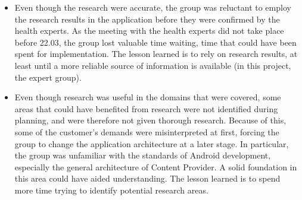 \begin{itemize}
\item
Even though the research were accurate, the group was reluctant to employ the research results in the application before they were confirmed by the health experts. As the meeting with the health experts did not take place before 22.03, the group lost valuable time waiting, time that could have been spent for implementation. The lesson learned is to rely on research results, at least until a more reliable source of information is available (in this project, the expert group).
\item
Even though research was useful in the domains that were covered, some areas that could have benefited from research were not identified during planning, and were therefore not given thorough research. Because of this, some of the customer's demands were misinterpreted at first, forcing the group to change the application architecture at a later stage. In particular, the group was unfamiliar with the standards of Android development, especially the general architecture of Content Provider. A solid foundation in this area could have aided understanding. The lesson learned is to spend more time trying to identify potential research areas. 
\end{itemize}